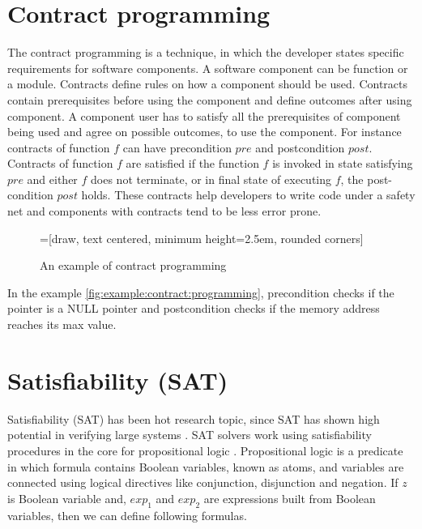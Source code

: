 \section{Contract programming} \label{sec:back:contact:prog}
The contract programming is a technique, in which the developer states specific requirements for software components. A software component can be function or a module. Contracts define rules on how a component should be used. Contracts contain prerequisites before using the component and define outcomes after using component. A component user has to satisfy all the prerequisites of component being used and agree on possible outcomes, to use the component. For instance contracts of function $f$ can have precondition $pre$ and postcondition $post$. Contracts of function $f$ are satisfied if the function $f$ is invoked in state satisfying $pre$ and either $f$ does not terminate, or in final state of executing $f$, the post-condition $post$ holds. These contracts help developers to write code under a safety net and components with contracts tend to be less error prone. \cite{Meyer:1992:ADC:618974.619797}

\begin{figure}[htbp]
    \centering
    =[draw, text centered, minimum height=2.5em, rounded corners]

   \caption{An example of contract programming}
   \label{fig:example:contract:programming}
\end{figure}


In the example \autoref{fig:example:contract:programming}, precondition checks if the pointer is a NULL pointer and postcondition checks if the memory address reaches its max value.


\section{Satisfiability (SAT)} \label{sec:sat:solver}

 Satisfiability (SAT) has been hot research topic, since SAT has shown high potential in verifying large systems \cite{moskewicz2001chaff}. SAT solvers work using satisfiability procedures in the core for propositional logic \cite{DeMoura:2011:SMT:1995376.1995394}. Propositional logic is a predicate in which formula contains Boolean variables, known as atoms, and variables are connected using logical directives like conjunction, disjunction and negation.  If $z$ is Boolean variable and, $exp_1$ and $exp_2$ are expressions built from Boolean variables, then we can define following formulas.

